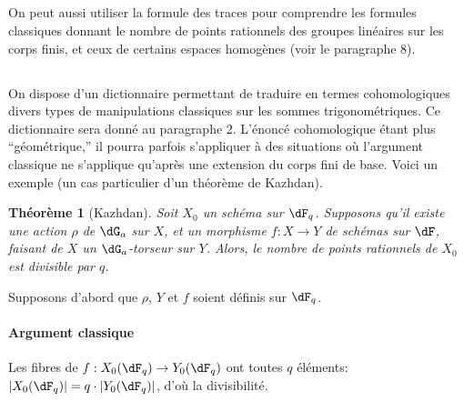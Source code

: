 \documentclass[oneside]{book}
\theoremstyle{sga-source}
\theoremstyle{sga-source-dash}
\theoremstyle{sga-source-dotdash}
\theoremstyle{sga-source-number-note-dash}
\theoremstyle{sga-source-note-number-dotdash}
\theoremstyle{sga-source-example-dotdash}
\theoremstyle{sga-source-inline-number}
\theoremstyle{sga-source-bare-number}
\theoremstyle{sga-source}
\newtheorem{theorem_}[subsection]{Théorème}
\newcommand{\PrintPage}[1]{}\newcommand{\MathPage}[1]{}\newcommand{\PrintCite}[2]{#1}\newcommand{\var}[3]{#1}
\begin{document}
\subsection{}\label{VI:1-11}

On peut aussi utiliser la formule des traces pour comprendre les formules 
classiques donnant le nombre de points rationnels des groupes linéaires sur 
les corps finis, et ceux de certains espaces homogènes (voir le paragraphe 
8). 





\subsection{}\label{VI:1-12}

On dispose d'un dictionnaire permettant de traduire en termes cohomologiques 
divers types de manipulations classiques sur les sommes 
trigonométriques. Ce dictionnaire sera donné au paragraphe 2. L'énoncé 
cohomologique étant plus ``géométrique,'' il pourra parfois s'appliquer 
à des situations où l'argument classique ne s'applique qu'après une 
extension du corps fini de base. Voici un exemple (un cas particulier d'un 
théorème de Kazhdan). 





\begin{theorem_}[Kazhdan]\label{VI:1-13}
Soit $X_0$ un schéma sur $\dF_q$. Supposons qu'il existe une action $\rho$ de 
$\dG_a$ sur $X$, et un morphisme $f:X\to Y$ de schémas sur $\dF$, faisant de 
$X$ un $\dG_a$-torseur sur $Y$. Alors, le nombre de points rationnels de $X_0$ 
est divisible par $q$.
\end{theorem_}

\PrintPage{176}
Supposons d'abord que $\rho$, $Y$ et $f$ soient définis sur $\dF_q$. 


\paragraph{Argument classique}
Les fibres de $f:X_0(\dF_q)\to Y_0(\dF_q)$ ont toutes $q$ éléments: 
$|X_0(\dF_q)| = q\cdot |Y_0(\dF_q)|$, d'où la divisibilité. 
\end{document}
